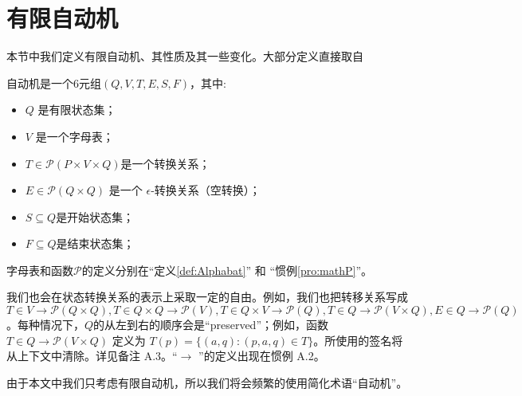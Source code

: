 \chapter{有限自动机}

本节中我们定义有限自动机、其性质及其一些变化。大部分定义直接取自 %

\begin{definition}
    自动机是一个$6$元组$(Q,V,T,E,S,F)$，其中:
    \begin{itemize}
        \item $Q$ 是有限状态集；
        \item $V$ 是一个字母表；
        \item $ T \in \mathcal{P}(P\times V \times Q) $是一个转换关系；
        \item $ E \in \mathcal{P}(Q\times Q)$ 是一个 $\epsilon$-转换关系（空转换）；
        \item $ S \subseteq Q $是开始状态集；
        \item $ F \subseteq Q $是结束状态集；     
    \end{itemize}
    字母表和函数$\mathcal{P}$的定义分别在“定义\ref{def:Alphabat}” 和 “惯例\ref{pro:mathP}”。
\end{definition}


\begin{remark}
    我们也会在状态转换关系的表示上采取一定的自由。例如，我们也把转移关系写成 $T\in V \longrightarrow \mathcal{P}(Q\times Q),T\in Q \times Q \longrightarrow \mathcal{P}(V),T\in Q \times V \longrightarrow \mathcal{P}(Q),T\in Q \longrightarrow \mathcal{P}(V\times Q),E\in Q \longrightarrow \mathcal{P}(Q)$。每种情况下，$Q$的从左到右的顺序会是“preserved”；例如，函数$T\in Q \longrightarrow \mathcal{P}(V \times Q)$ 定义为 $T(p)=\{ (a,q) : (p,a,q) \in T \}$。所使用的签名将从上下文中清除。详见备注 A.3。“$\longrightarrow$ ”的定义出现在惯例 A.2。

    由于本文中我们只考虑有限自动机，所以我们将会频繁的使用简化术语“自动机”。
\end{remark}


